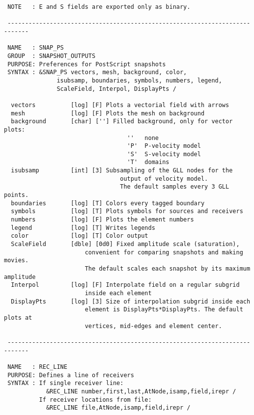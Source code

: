 \begin{verbatim}
 NOTE   : E and S fields are exported only as binary.

 ----------------------------------------------------------------------------

 NAME   : SNAP_PS
 GROUP  : SNAPSHOT_OUTPUTS
 PURPOSE: Preferences for PostScript snapshots
 SYNTAX : &SNAP_PS vectors, mesh, background, color,
               isubsamp, boundaries, symbols, numbers, legend,
               ScaleField, Interpol, DisplayPts /

  vectors          [log] [F] Plots a vectorial field with arrows
  mesh             [log] [F] Plots the mesh on background
  background       [char] [''] Filled background, only for vector plots:
                                   ''   none 
                                   'P'  P-velocity model
                                   'S'  S-velocity model
                                   'T'  domains 
  isubsamp         [int] [3] Subsampling of the GLL nodes for the
                                 output of velocity model. 
                                 The default samples every 3 GLL points.
  boundaries       [log] [T] Colors every tagged boundary
  symbols          [log] [T] Plots symbols for sources and receivers
  numbers          [log] [F] Plots the element numbers
  legend           [log] [T] Writes legends
  color            [log] [T] Color output
  ScaleField       [dble] [0d0] Fixed amplitude scale (saturation),
                       convenient for comparing snapshots and making movies. 
                       The default scales each snapshot by its maximum amplitude
  Interpol         [log] [F] Interpolate field on a regular subgrid 
                       inside each element
  DisplayPts       [log] [3] Size of interpolation subgrid inside each 
                       element is DisplayPts*DisplayPts. The default plots at 
                       vertices, mid-edges and element center.
               
 ----------------------------------------------------------------------------

 NAME   : REC_LINE
 PURPOSE: Defines a line of receivers
 SYNTAX : If single receiver line: 
            &REC_LINE number,first,last,AtNode,isamp,field,irepr /
          If receiver locations from file:
            &REC_LINE file,AtNode,isamp,field,irepr /


\end{verbatim}
